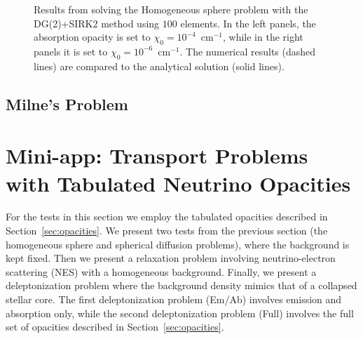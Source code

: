 \documentclass[10pt,preprint]{aastex}
\begin{document}
\begin{figure}
\begin{center}
\begin{tabular}{cc}
    \end{tabular}
  \end{center}
  \caption{Results from solving the Homogeneous sphere problem with the DG(2)+SIRK2 method using $100$ elements.  
  In the left panels, the absorption opacity is set to $\chi_{0}=10^{-4}$~cm$^{-1}$, while in the right panels it is set to $\chi_{0}=10^{-6}$~cm$^{-1}$.  
  The numerical results (dashed lines) are compared to the analytical solution (solid lines).}
  \label{fig:homogeneousSphere1D}
\end{figure}

\subsection{Milne's Problem}

\section{Mini-app: Transport Problems with Tabulated Neutrino Opacities}

For the tests in this section we employ the tabulated opacities described in Section~\ref{sec:opacities}.  
We present two tests from the previous section (the homogeneous sphere and spherical diffusion problems), where the background is kept fixed.  
Then we present a relaxation problem involving neutrino-electron scattering (NES) with a homogeneous background.  
Finally, we present a deleptonization problem where the background density mimics that of a collapsed stellar core.  
The first deleptonization problem (Em/Ab) involves emission and absorption only, while the second deleptonization problem (Full) involves the full set of opacities described in Section~\ref{sec:opacities}.  
\end{document}
